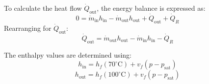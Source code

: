 To calculate the heat flow \( \dot{Q}_{\text{out}} \), the energy balance is expressed as:  
\[
0 = \dot{m}_{\text{in}} h_{\text{in}} - \dot{m}_{\text{out}} h_{\text{out}} + \dot{Q}_{\text{out}} + \dot{Q}_R
\]  
Rearranging for \( \dot{Q}_{\text{out}} \):  
\[
\dot{Q}_{\text{out}} = \dot{m}_{\text{out}} h_{\text{out}} - \dot{m}_{\text{in}} h_{\text{in}} - \dot{Q}_R
\]  

The enthalpy values are determined using:  
\[
h_{\text{in}} = h_f(70^\circ\text{C}) + v_f(p - p_{\text{sat}})
\]  
\[
h_{\text{out}} = h_f(100^\circ\text{C}) + v_f(p - p_{\text{sat}})
\]